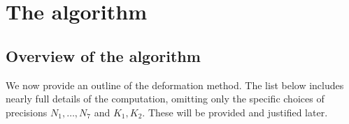 \documentclass[a4paper,11pt]{article}
\numberwithin{equation}{section}
\theoremstyle{definition}
\begin{document}

\section{The algorithm}
\label{sec:Algorithm}

\subsection{Overview of the algorithm}

We now provide an outline of the deformation method.  The list below 
includes nearly full details of the computation, omitting only the 
specific choices of precisions $N_1, \dotsc, N_7$
and $K_1, K_2$. These will be provided and justified later.
\end{document}

